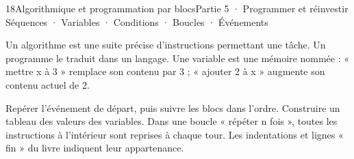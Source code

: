 \begin{ouverture}[algorithmique]{18}{Algorithmique et programmation par blocs}{Partie 5 · Programmer et réinvestir}
{Séquences · Variables · Conditions · Boucles · Événements}
\end{ouverture}
\pagestyle{otMain}\essentiel\fontsize{11}{15}\selectfont
{}\label{cours-18-1}
\begin{definition}Un algorithme est une suite précise d’instructions permettant une tâche. Un programme le traduit dans un langage. Une variable est une mémoire nommée : « mettre x à 3 » remplace son contenu par 3 ; « ajouter 2 à x » augmente son contenu actuel de 2.\end{definition}
\begin{savoirfaire}Repérer l’événement de départ, puis suivre les blocs dans l’ordre. Construire un tableau des valeurs des variables. Dans une boucle « répéter n fois », toutes les instructions à l’intérieur sont reprises à chaque tour. Les indentations et lignes « fin » du livre indiquent leur appartenance.\end{savoirfaire}
\label{fig-cours-18-1-script-01}

